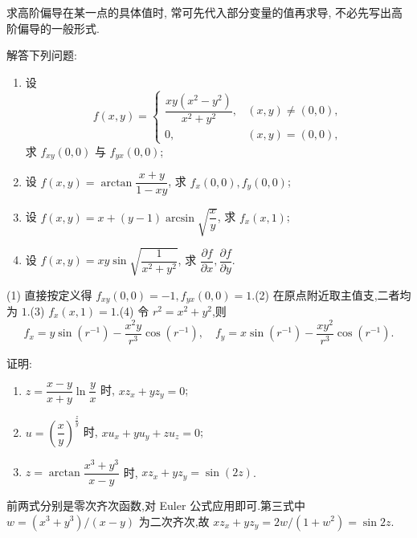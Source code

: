\begin{remark}
    求高阶偏导在某一点的具体值时, 常可先代入部分变量的值再求导, 不必先写出高阶偏导的一般形式.
\end{remark}

\begin{example}
    解答下列问题:
    \begin{enumerate}
        \item 设
              \[
                  f(x,y)=
                  \begin{cases}
                      \dfrac{xy(x^2-y^2)}{x^2+y^2}, & (x,y)\ne(0,0), \\
                      0,                            & (x,y)=(0,0),
                  \end{cases}
              \]
              求 $f_{xy}(0,0)$ 与 $f_{yx}(0,0)$;
        \item 设 $\displaystyle f(x,y)=\arctan\dfrac{x+y}{1-xy}$, 求 $f_x(0,0),f_y(0,0)$;
        \item 设 $\displaystyle f(x,y)=x+(y-1)\arcsin\sqrt{\dfrac{x}{y}}$, 求 $f_x(x,1)$;
        \item 设 $\displaystyle f(x,y)=xy\sin\sqrt{\dfrac{1}{x^2+y^2}}$, 求 $\dfrac{\partial f}{\partial x},\dfrac{\partial f}{\partial y}$.
    \end{enumerate}
\end{example}
\exampleblank

\begin{solution}
    (1) 直接按定义得 $f_{xy}(0,0)=-1,f_{yx}(0,0)=1$.(2) 在原点附近取主值支,二者均为 $1$.(3) $f_x(x,1)=1$.(4) 令 $r^2=x^2+y^2$,则
    \[
        f_x=y\sin(r^{-1})-\dfrac{x^2y}{r^3}\cos(r^{-1}),\quad
        f_y=x\sin(r^{-1})-\dfrac{xy^2}{r^3}\cos(r^{-1}).
    \]
\end{solution}

\begin{example}
    证明:
    \begin{enumerate}
        \item $\displaystyle z=\dfrac{x-y}{x+y}\ln\dfrac{y}{x}$ 时, $xz_x+yz_y=0$;
        \item $\displaystyle u=\left(\dfrac{x}{y}\right)^{\frac{z}{y}}$ 时, $xu_x+yu_y+zu_z=0$;
        \item $\displaystyle z=\arctan\dfrac{x^3+y^3}{x-y}$ 时, $xz_x+yz_y=\sin(2z)$.
    \end{enumerate}
\end{example}
\exampleblank

\begin{solution}
    前两式分别是零次齐次函数,对 Euler 公式应用即可.第三式中 $w=(x^3+y^3)/(x-y)$ 为二次齐次,故 $xz_x+yz_y=2w/(1+w^2)=\sin2z$.
\end{solution}

